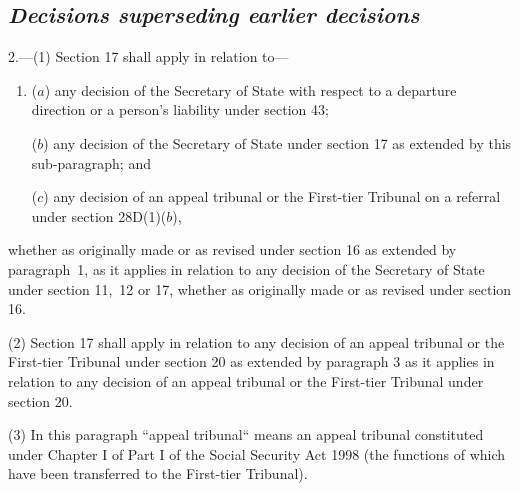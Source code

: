 \documentclass[12pt,a4paper]{article}
\begin{document}
\subsection*{\itshape Decisions superseding earlier decisions}

2.---(1) Section 17 shall apply in relation to—
\begin{enumerate}\item[]
($a$) any decision of the Secretary of State with respect to a departure direction
or a person’s liability under section 43;

($b$) any decision of the Secretary of State under section 17 as extended by this sub-paragraph; and

($c$) any decision of 
an appeal tribunal or  %
the First-tier Tribunal  %
on a referral under section 28D(1)($b$),
\end{enumerate}
whether as originally made or as revised under section 16 as extended by paragraph~1, as it applies in relation to any decision of the Secretary of State under section 11,~12 or 17, whether as originally made or as revised under section 16.

(2) Section 17 shall apply in relation to any decision of 
an appeal tribunal or  %
the First-tier Tribunal  %
under section 20 as extended by paragraph 3 as it applies in relation to any decision of 
an appeal tribunal or  %
the First-tier Tribunal  %
under section 20.

(3) In this paragraph “appeal tribunal“ means an appeal tribunal constituted under Chapter I of Part I of the Social Security Act 1998 (the functions of which have been transferred to the First-tier Tribunal).

\end{document}
